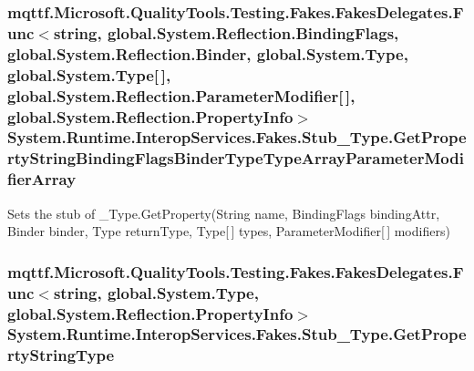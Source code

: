 \hypertarget{class_system_1_1_runtime_1_1_interop_services_1_1_fakes_1_1_stub___type_a7a10a2c1cb09cbca9aa17e2b35d47165}{
\subsubsection[{Get\-Property\-String\-Binding\-Flags\-Binder\-Type\-Type\-Array\-Parameter\-Modifier\-Array}]{\setlength{\rightskip}{0pt plus 5cm}mqttf.\-Microsoft.\-Quality\-Tools.\-Testing.\-Fakes.\-Fakes\-Delegates.\-Func$<$string, global.\-System.\-Reflection.\-Binding\-Flags, global.\-System.\-Reflection.\-Binder, global.\-System.\-Type, global.\-System.\-Type\mbox{[}$\,$\mbox{]}, global.\-System.\-Reflection.\-Parameter\-Modifier\mbox{[}$\,$\mbox{]}, global.\-System.\-Reflection.\-Property\-Info$>$ System.\-Runtime.\-Interop\-Services.\-Fakes.\-Stub\-\_\-\-Type.\-Get\-Property\-String\-Binding\-Flags\-Binder\-Type\-Type\-Array\-Parameter\-Modifier\-Array}}\label{class_system_1_1_runtime_1_1_interop_services_1_1_fakes_1_1_stub___type_a7a10a2c1cb09cbca9aa17e2b35d47165}


Sets the stub of \-\_\-\-Type.\-Get\-Property(\-String name, Binding\-Flags binding\-Attr, Binder binder, Type return\-Type, Type\mbox{[}$\,$\mbox{]} types, Parameter\-Modifier\mbox{[}$\,$\mbox{]} modifiers)

\hypertarget{class_system_1_1_runtime_1_1_interop_services_1_1_fakes_1_1_stub___type_af3f4241b217ebd3093a275711d814249}{
\subsubsection[{Get\-Property\-String\-Type}]{\setlength{\rightskip}{0pt plus 5cm}mqttf.\-Microsoft.\-Quality\-Tools.\-Testing.\-Fakes.\-Fakes\-Delegates.\-Func$<$string, global.\-System.\-Type, global.\-System.\-Reflection.\-Property\-Info$>$ System.\-Runtime.\-Interop\-Services.\-Fakes.\-Stub\-\_\-\-Type.\-Get\-Property\-String\-Type}}\label{class_system_1_1_runtime_1_1_interop_services_1_1_fakes_1_1_stub___type_af3f4241b217ebd3093a275711d814249}


